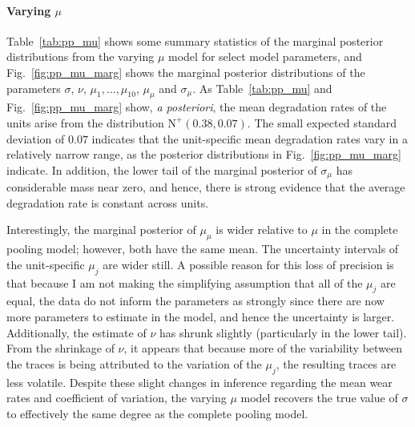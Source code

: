 \paragraph{Varying $\mu$} Table~\ref{tab:pp_mu} shows some summary statistics of the marginal posterior distributions from the varying $\mu$ model for select model parameters, and Fig.~\ref{fig:pp_mu_marg} shows the marginal posterior distributions of the parameters $\sigma$, $\nu$, $\mu_1, \ldots, \mu_{10}$, $\mu_{\mu}$ and $\sigma_{\mu}$. As Table~\ref{tab:pp_mu} and Fig.~\ref{fig:pp_mu_marg} show, \textit{a posteriori}, the mean degradation rates of the units arise from the distribution $\mbox{N}^{+}(0.38, 0.07)$. The small expected standard deviation of $0.07$ indicates that the unit-specific mean degradation rates vary in a relatively narrow range, as the posterior distributions in Fig.~\ref{fig:pp_mu_marg} indicate. In addition, the lower tail of the marginal posterior of $\sigma_\mu$ has considerable mass near zero, and hence, there is strong evidence that the average degradation rate is constant across units. 

Interestingly, the marginal posterior of $\mu_\mu$ is wider relative to $\mu$ in the complete pooling model; however, both have the same mean. The uncertainty intervals of the unit-specific $\mu_j$ are wider still. A possible reason for this loss of precision is that because I am not making the simplifying assumption that all of the $\mu_j$ are equal, the data do not inform the parameters as strongly since there are now more parameters to estimate in the model, and hence the uncertainty is larger. Additionally, the estimate of $\nu$ has shrunk slightly (particularly in the lower tail). From the shrinkage of $\nu$, it appears that because more of the variability between the traces is being attributed to the variation of the $\mu_j$, the resulting traces are less volatile. Despite these slight changes in inference regarding the mean wear rates and coefficient of variation, the varying $\mu$ model recovers the true value of $\sigma$ to effectively the same degree as the complete pooling model.



